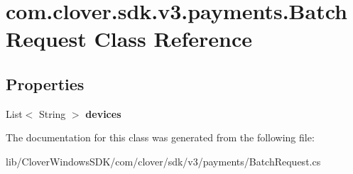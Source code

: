 \hypertarget{classcom_1_1clover_1_1sdk_1_1v3_1_1payments_1_1_batch_request}{}\section{com.\+clover.\+sdk.\+v3.\+payments.\+Batch\+Request Class Reference}
\label{classcom_1_1clover_1_1sdk_1_1v3_1_1payments_1_1_batch_request}
\subsection*{Properties}
\begin{DoxyCompactItemize}
\item 
\mbox{\label{classcom_1_1clover_1_1sdk_1_1v3_1_1payments_1_1_batch_request_ad73f16031147ea6ecd12c231328f3700}} 
List$<$ String $>$ {\bfseries devices}
\end{DoxyCompactItemize}


The documentation for this class was generated from the following file\+:\begin{DoxyCompactItemize}
\item 
lib/\+Clover\+Windows\+S\+D\+K/com/clover/sdk/v3/payments/Batch\+Request.\+cs\end{DoxyCompactItemize}
